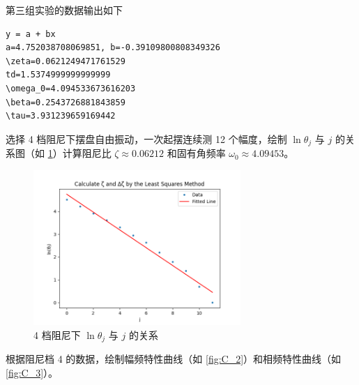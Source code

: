 \documentclass[12pt,a4paper]{amsart}
\begin{document}
第三组实验的数据输出如下

\begin{lstlisting}[label={lst:3}, caption={第三组实验数据处理结果}]
y = a + bx
a=4.752038708069851, b=-0.39109800808349326
\zeta=0.0621249471761529
td=1.5374999999999999
\omega_0=4.094533673616203
\beta=0.2543726881843859
\tau=3.931239659169442
\end{lstlisting}

选择 4 档阻尼下摆盘自由振动，一次起摆连续测 12 个幅度，绘制 $\ln\theta_j$ 与 $j$ 的关系图（如 \ref{fig:C_1}）计算阻尼比 $\zeta \approx 0.06212$ 和固有角频率 $\omega_0 \approx 4.09453$。

\begin{figure}[H]
	\centering
	\includegraphics[width=0.7\textwidth]{img/C_1.png}
	\caption{4 档阻尼下 $\ln\theta_j$ 与 $j$ 的关系}
	\label{fig:C_1}
\end{figure}

根据阻尼档 4 的数据，绘制幅频特性曲线（如 \ref{fig:C_2}）和相频特性曲线（如 \ref{fig:C_3}）。
\end{document}
